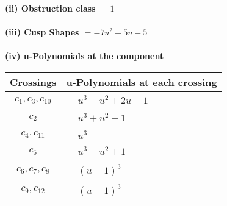 \documentclass[1p]{elsarticle_modified}
\theoremstyle{definition}
\begin{document}
\flushleft \textbf{(ii) Obstruction class $= 1$}\\~\\
\flushleft \textbf{(iii) Cusp Shapes $= -7 u^2+5 u-5$}\\~\\
\newpage\renewcommand{\arraystretch}{1}
\flushleft \textbf{(iv) u-Polynomials at the component}\newline \\
\begin{tabular}{m{50pt}|m{274pt}}
Crossings & \hspace{64pt}u-Polynomials at each crossing \\
\hline $$\begin{aligned}c_{1},c_{3},c_{10}\end{aligned}$$&$\begin{aligned}
&u^3- u^2+2 u-1
\end{aligned}$\\
\hline $$\begin{aligned}c_{2}\end{aligned}$$&$\begin{aligned}
&u^3+u^2-1
\end{aligned}$\\
\hline $$\begin{aligned}c_{4},c_{11}\end{aligned}$$&$\begin{aligned}
&u^3
\end{aligned}$\\
\hline $$\begin{aligned}c_{5}\end{aligned}$$&$\begin{aligned}
&u^3- u^2+1
\end{aligned}$\\
\hline $$\begin{aligned}c_{6},c_{7},c_{8}\end{aligned}$$&$\begin{aligned}
&(u+1)^3
\end{aligned}$\\
\hline $$\begin{aligned}c_{9},c_{12}\end{aligned}$$&$\begin{aligned}
&(u-1)^3
\end{aligned}$\\
\hline
\end{tabular}\\~\\
\newpage\renewcommand{\arraystretch}{1}
\end{document}
